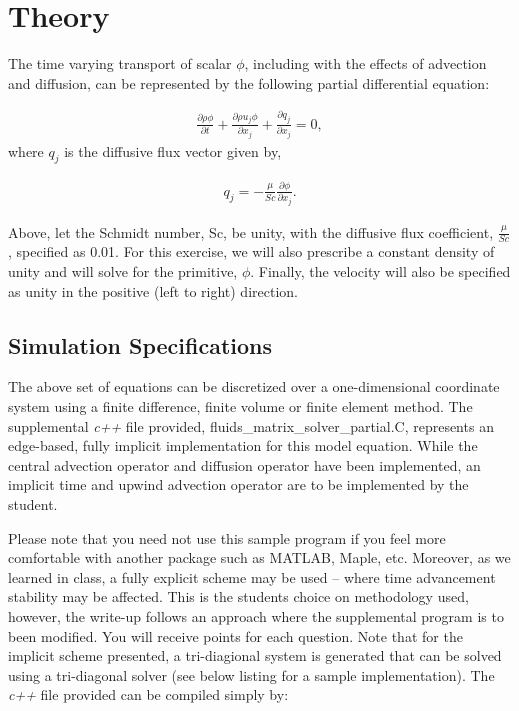 \documentclass{article}
\begin{document}
\section{Theory}
\label{s:theory}
The time varying transport of scalar $\phi$, including with the effects of advection and diffusion, can be represented by the following partial differential equation:

\begin{align}
 \frac {\partial \rho \phi }{\partial t} + \frac{ \partial \rho u_j \phi }{\partial x_j} + \frac{\partial q_j}{\partial x_j} = 0,
\label{eq:contEq}
\end{align} 
where $q_j$ is the diffusive flux vector given by,

\begin{align}
  q_j = -\frac{\mu}{Sc} \frac{\partial \phi}{\partial x_j}.
\label{eq:momEq}
\end{align}

Above, let the Schmidt number, Sc, be unity, with the diffusive flux coefficient, $\frac{\mu}{Sc}$, specified as 0.01.
For this exercise, we will also prescribe a constant density of unity and will solve for the primitive, $\phi$. Finally, the velocity
will also be specified as unity in the positive (left to right) direction.

\subsection{Simulation Specifications}

The above set of equations can be discretized over a one-dimensional coordinate system using a finite difference, finite
volume or finite element method. The supplemental \textit{c++} file provided, fluids\_matrix\_solver\_partial.C, represents
an edge-based, fully implicit implementation for this model equation. While the central advection operator and diffusion operator
have been implemented, an implicit time and upwind advection operator are to be implemented by the student.

Please note that you need not use this sample program if you feel more comfortable with another package such as MATLAB, Maple, etc. Moreover, as we learned in class, a fully explicit scheme may be used -- where time advancement stability may be affected. This is the students choice on methodology used, however, the write-up follows an approach where the supplemental program is to been modified. You will receive points for each question. Note that for the implicit scheme presented, a tri-diagional system is generated that can be solved using a tri-diagonal solver (see below
listing for a sample implementation).  The \textit{c++} file provided can be compiled simply by:
\end{document}

